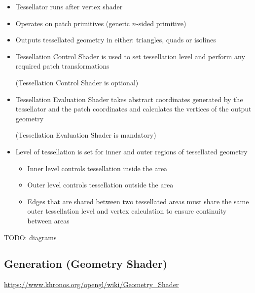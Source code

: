 \documentclass[a4paper]{article}
\begin{document}
\begin{itemize}
  \item
    Tessellator runs after vertex shader

  \item
    Operates on patch primitives (generic $n$-sided primitive)

  \item
    Outputs tessellated geometry in either: triangles, quads or isolines

  \item
    Tessellation Control Shader is used to set tessellation level and perform
    any required patch transformations

    (Tessellation Control Shader is optional)

  \item
    Tessellation Evaluation Shader takes abstract coordinates generated by the
    tessellator and the patch coordinates and calculates the vertices of the
    output geometry

    (Tessellation Evaluation Shader is mandatory)

  \item
    Level of tessellation is set for inner and outer regions of tessellated
    geometry

    \begin{itemize}
      \item
        Inner level controls tessellation inside the area

      \item
        Outer level controls tessellation outside the area

      \item
        Edges that are shared between two tessellated areas must share the same
        outer tessellation level and vertex calculation to ensure continuity
        between areas
    \end{itemize}

\end{itemize}

TODO: diagrams

\subsection{Generation (Geometry Shader)}

\url{https://www.khronos.org/opengl/wiki/Geometry_Shader}
\end{document}
